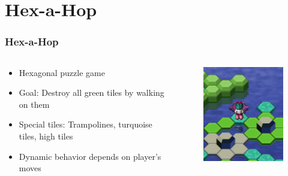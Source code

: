 \section{Hex-a-Hop}

\begin{frame}
	\frametitle{Hex-a-Hop}
	\begin{columns}
		\begin{column}{6cm}
			\begin{itemize}
				\item Hexagonal puzzle game
				\item<2-> Goal: Destroy all green tiles by walking on them
				\item<3-> Special tiles: Trampolines, turquoise tiles, high tiles
				\item<4-> Dynamic behavior depends on player's moves
			\end{itemize}
		\end{column}
		\begin{column}{5cm}
			\begin{figure}
				\centering
				\includegraphics[width=5cm]{images/hexahop.png}
			\end{figure}
		\end{column}
	\end{columns}
\end{frame}

